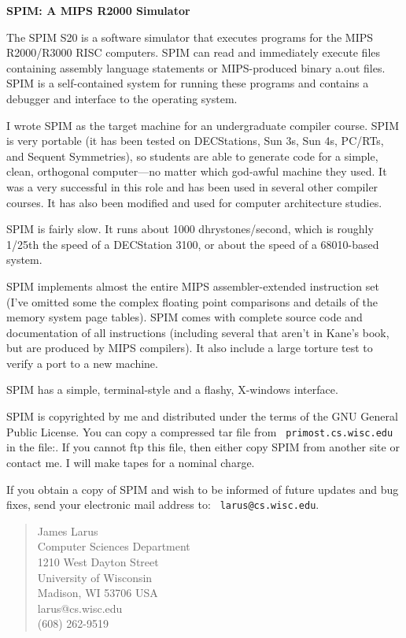 


\begin{center}
  \LARGE\bf SPIM: A MIPS R2000 Simulator
\end{center}

The SPIM S20 is a software simulator that executes programs for the
MIPS R2000/R3000 RISC computers.  SPIM can read and immediately
execute files containing assembly language statements or MIPS-produced
binary a.out files.  SPIM is a self-contained system for running these
programs and contains a debugger and interface to the operating
system.

I wrote SPIM as the target machine for an undergraduate compiler
course. SPIM is very portable (it has been tested on DECStations, Sun
3s, Sun 4s, PC/RTs, and Sequent Symmetries), so students are able to
generate code for a simple, clean, orthogonal computer---no matter
which god-awful machine they used.  It was a very successful in this
role and has been used in several other compiler courses.  It has also
been modified and used for computer architecture studies.

SPIM is fairly slow.  It runs about 1000 dhrystones/second, which is
roughly 1/25th the speed of a DECStation 3100, or about the speed of a
68010-based system.

SPIM implements almost the entire MIPS assembler-extended instruction
set (I've omitted some the complex floating point comparisons and
details of the memory system page tables).  SPIM comes with complete
source code and documentation of all instructions (including several
that aren't in Kane's book, but are produced by MIPS compilers).  It
also include a large torture test to verify a port to a new machine.

SPIM has a simple, terminal-style and a flashy, X-windows interface.

SPIM is copyrighted by me and distributed under the terms of the GNU
General Public License.  You can copy a compressed tar file from {\tt
primost.cs.wisc.edu} in the file:.
If you cannot ftp this file, then either copy SPIM from another site
or contact me.  I will make tapes for a nominal charge.

If you obtain a copy of SPIM and wish to be informed of future updates
and bug fixes, send your electronic mail address to: {\tt
larus@cs.wisc.edu}.

\begin{quote}
James Larus\\
Computer Sciences Department\\
1210 West Dayton Street\\
University of Wisconsin\\
Madison, WI 53706 USA\\
larus@cs.wisc.edu\\
(608) 262-9519
\end{quote}
